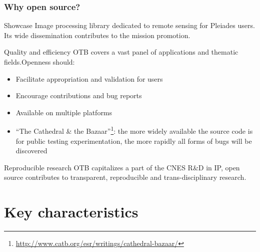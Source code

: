 \documentclass[8pt]{beamer}
\begin{document}
\begin{frame}
\frametitle{Why open source?}

\begin{block}{Showcase}
Image processing library dedicated to remote sensing for Pleiades users. Its wide
dissemination contributes to the mission promotion.
\end{block}

\begin{block}{Quality and efficiency}
OTB covers a vast panel of applications and thematic fields.Openness should:
\begin{itemize}
\item Facilitate appropriation and validation for users
\item Encourage contributions and bug reports
\item Available on multiple platforms
\item ``The Cathedral \& the
  Bazaar''\footnote{\url{http://www.catb.org/esr/writings/cathedral-bazaar/}}: the more widely available the source code is for public testing
  experimentation, the more rapidly all forms of bugs will be discovered 
\end{itemize}
\end{block}

\begin{block}{Reproducible research}
OTB capitalizes a part of the CNES R\&D in IP, open source contributes to  transparent, \alert{reproducible} and trans-disciplinary \alert{research}.
\end{block}

\end{frame}

\section{Key characteristics}
\end{document}
